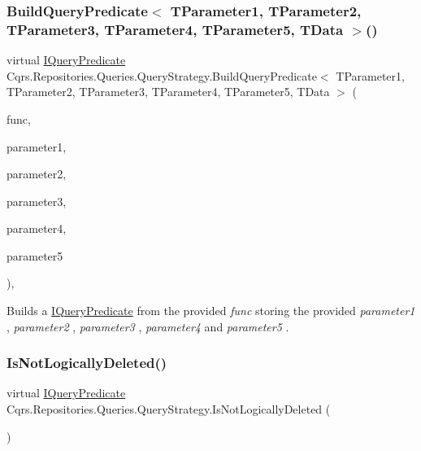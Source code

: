\subsubsection{\texorpdfstring{Build\+Query\+Predicate$<$ T\+Parameter1, T\+Parameter2, T\+Parameter3, T\+Parameter4, T\+Parameter5, T\+Data $>$()}{BuildQueryPredicate< TParameter1, TParameter2, TParameter3, TParameter4, TParameter5, TData >()}}
{\footnotesize\ttfamily virtual \hyperlink{interfaceCqrs_1_1Repositories_1_1Queries_1_1IQueryPredicate}{I\+Query\+Predicate} Cqrs.\+Repositories.\+Queries.\+Query\+Strategy.\+Build\+Query\+Predicate$<$ T\+Parameter1, T\+Parameter2, T\+Parameter3, T\+Parameter4, T\+Parameter5, T\+Data $>$ (\begin{DoxyParamCaption}\item[{Func$<$ T\+Parameter1, T\+Parameter2, T\+Parameter3, T\+Parameter4, T\+Parameter5, T\+Data $>$}]{func,  }\item[{T\+Parameter1}]{parameter1,  }\item[{T\+Parameter2}]{parameter2,  }\item[{T\+Parameter3}]{parameter3,  }\item[{T\+Parameter4}]{parameter4,  }\item[{T\+Parameter5}]{parameter5 }\end{DoxyParamCaption})\hspace{0.3cm}{\ttfamily [protected]}, {\ttfamily [virtual]}}



Builds a \hyperlink{interfaceCqrs_1_1Repositories_1_1Queries_1_1IQueryPredicate}{I\+Query\+Predicate} from the provided {\itshape func}  storing the provided {\itshape parameter1} , {\itshape parameter2} , {\itshape parameter3} , {\itshape parameter4}  and {\itshape parameter5} . 

\mbox{\label{classCqrs_1_1Repositories_1_1Queries_1_1QueryStrategy_ab1841119fbbb58337d55b014a8b260b4_ab1841119fbbb58337d55b014a8b260b4}} 
\subsubsection{\texorpdfstring{Is\+Not\+Logically\+Deleted()}{IsNotLogicallyDeleted()}}
{\footnotesize\ttfamily virtual \hyperlink{interfaceCqrs_1_1Repositories_1_1Queries_1_1IQueryPredicate}{I\+Query\+Predicate} Cqrs.\+Repositories.\+Queries.\+Query\+Strategy.\+Is\+Not\+Logically\+Deleted (\begin{DoxyParamCaption}{ }\end{DoxyParamCaption})\hspace{0.3cm}{\ttfamily [virtual]}}



